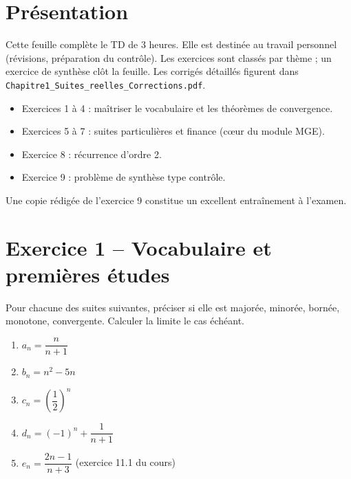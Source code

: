 \documentclass[11pt,a4paper]{article}
\begin{document}

\section*{Présentation}

Cette feuille complète le TD de 3 heures. Elle est destinée au travail personnel (révisions, préparation du contrôle). Les exercices sont classés par thème ; un exercice de synthèse clôt la feuille. Les corrigés détaillés figurent dans \texttt{Chapitre1\_Suites\_reelles\_Corrections.pdf}.

\begin{objectifbox}
\begin{itemize}
  \item Exercices 1 à 4 : maîtriser le vocabulaire et les théorèmes de convergence.
  \item Exercices 5 à 7 : suites particulières et finance (cœur du module MGE).
  \item Exercice 8 : récurrence d'ordre 2.
  \item Exercice 9 : problème de synthèse type contrôle.
\end{itemize}
Une copie rédigée de l'exercice 9 constitue un excellent entraînement à l'examen.
\end{objectifbox}

\section*{Exercice 1 -- Vocabulaire et premières études}

Pour chacune des suites suivantes, préciser si elle est majorée, minorée, bornée, monotone, convergente. Calculer la limite le cas échéant.

\begin{enumerate}
  \item $a_n = \dfrac{n}{n+1}$
  \item $b_n = n^2 - 5n$
  \item $c_n = \left(\dfrac{1}{2}\right)^n$
  \item $d_n = (-1)^n + \dfrac{1}{n+1}$
  \item $e_n = \dfrac{2n-1}{n+3}$ \quad (exercice 11.1 du cours)
\end{enumerate}

\end{document}
